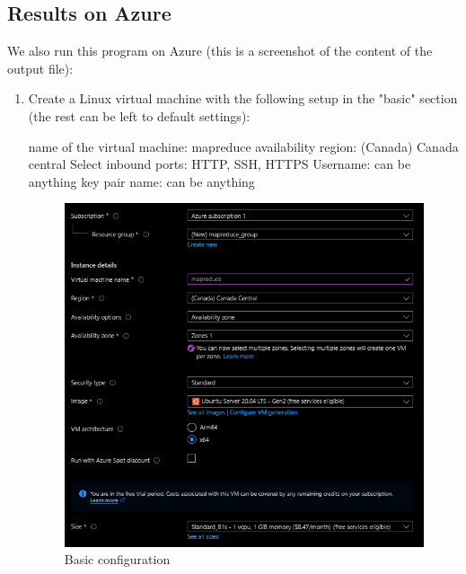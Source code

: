 \documentclass[11pt]{article}
\begin{document}
\begin{justifying}
\subsection{Results on Azure}
We also run this program on Azure (this is a screenshot of the content of the output file):
\begin{enumerate}
    \item Create a Linux virtual machine with the following setup in the "basic" section (the rest can be left to default settings): 
    \begin{python}
    name of the virtual machine: mapreduce
    availability region: (Canada) Canada central
    Select inbound ports: HTTP, SSH, HTTPS
    Username: can be anything
    key pair name: can be anything    
    \end{python}
    
\begin{figure}[H]
    \centering
    \includegraphics[width=\linewidth]{azure-setup1.PNG}
    \caption{Basic configuration}
    \label{fig:mrazure}
\end{figure}


\end{enumerate}
\end{justifying}
\end{document}
